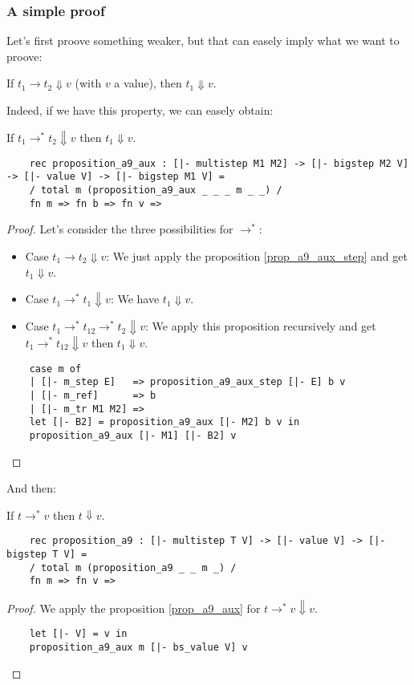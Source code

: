 \subsubsection{A simple proof}

Let's first proove something weaker, but that can easely imply what we want to
proove:

\begin{proposition}\label{prop_a9_aux_step}
  If $t_1 \longrightarrow t_2 \Downarrow v$ (with $v$ a value),
  then $t_1 \Downarrow v$.
\end{proposition}

Indeed, if we have this property, we can easely obtain:

\begin{proposition}[A9-aux]\label{prop_a9_aux}
  If $t_1 \longrightarrow^* t_2 \Downarrow v$ then $t_1 \Downarrow v$.
  \begin{lstlisting}
    rec proposition_a9_aux : [|- multistep M1 M2] -> [|- bigstep M2 V] -> [|- value V] -> [|- bigstep M1 V] =
    / total m (proposition_a9_aux _ _ _ m _ _) /
    fn m => fn b => fn v => 
  \end{lstlisting}
\end{proposition}
\begin{proof}
  Let's consider the three possibilities for $\rightarrow^*$:
  \begin{itemize}
  \item Case $t_1 \longrightarrow t_2 \Downarrow v$: We just apply the
    proposition \ref{prop_a9_aux_step} and get $t_1 \Downarrow v$.
  \item Case $t_1 \longrightarrow^* t_1 \Downarrow v$: We have
    $t_1 \Downarrow v$.
  \item Case $t_1 \longrightarrow^* t_{12} \longrightarrow^* t_2 \Downarrow v$:
    We apply this proposition recursively and get $t_1 \longrightarrow^* t_{12}
    \Downarrow v$ then $t_1 \Downarrow v$.
  \end{itemize}
  \begin{lstlisting}
    case m of
    | [|- m_step E]   => proposition_a9_aux_step [|- E] b v
    | [|- m_ref]      => b
    | [|- m_tr M1 M2] =>
    let [|- B2] = proposition_a9_aux [|- M2] b v in
    proposition_a9_aux [|- M1] [|- B2] v
  \end{lstlisting}
\end{proof}

And then:

\begin{proposition}[A9]
  If $t \longrightarrow^* v$ then $t \Downarrow v$.
  \begin{lstlisting}
    rec proposition_a9 : [|- multistep T V] -> [|- value V] -> [|- bigstep T V] =
    / total m (proposition_a9 _ _ m _) /
    fn m => fn v =>
  \end{lstlisting}
\end{proposition}
\begin{proof}
  We apply the proposition \ref{prop_a9_aux} for $t \longrightarrow^* v
  \Downarrow v$.
  \begin{lstlisting}
    let [|- V] = v in
    proposition_a9_aux m [|- bs_value V] v
  \end{lstlisting}
\end{proof}

